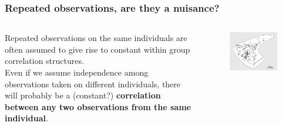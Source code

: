 \documentclass[10pt]{beamer}
\begin{document}
\begin{frame}[fragile]
\frametitle{Repeated observations, are they a nuisance?}

\begin{columns}

Repeated observations on the same individuals are often assumed to give rise to constant within group correlation structures.\\
\vspace{0.5cm}
Even if we assume independence among observations taken on different individuals, there will probably be a (constant?) {\bf correlation between any two observations from the same individual}.\\

\begin{figure}
\includegraphics[width=0.8\linewidth]{pictures/trajectory}
\end{figure}

\end{columns}
\end{frame}


\end{document}

